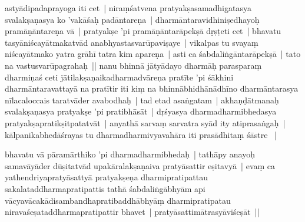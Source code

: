 \documentclass[article,12pt,a4paper]{memoir}%
\newcounter{parCount}
\begin{document}
astyādipadaprayoga iti cet | \label{thakur75-62.8} niraṃśatvena pratyakṣasamadhigatasya svalakṣaṇasya ko 'vakāśaḥ padāntareṇa | dharmāntaravidhiniṣedhayoḥ pramāṇāntareṇa vā | pratyakṣe 'pi pramāṇāntarāpekṣā dṛṣṭeti cet | bhavatu tasyāniścayātmakatvād anabhyastasvarūpaviṣaye | vikalpas tu svayaṃ niścayātmako yatra grāhī tatra kim apareṇa | asti ca śabdaliṅgāntarāpekṣā | tato na vastusvarūpagrahaḥ || \label{thakur75-62.13} nanu bhinnā jātyādayo dharmāḥ parasparaṃ dharmiṇaś ceti jātilakṣaṇaikadharmadvāreṇa pratīte 'pi śākhini dharmāntaravattayā na pratītir iti kiṃ na bhinnābhidhānādhīno dharmāntarasya nīlacaloccais taratvāder avabodhaḥ | tad etad asaṅgatam | akhaṇḍātmanaḥ svalakṣaṇasya pratyakṣe 'pi pratibhāsāt | dṛśyasya dharmadharmibhedasya pratyakṣapratikṣitpatatvāt | anyathā sarvaṃ sarvatra syād ity atiprasaṅgaḥ | kālpanikabhedāśrayas tu dharmadharmivyavahāra iti prasādhitaṃ śāstre  |
	{}
	\pend%
      

	  
	  \pstart \leavevmode%
	\label{thakur75-62.19}bhavatu vā pāramārthiko 'pi dharmadharmibhedaḥ | tathāpy anayoḥ samavāyāder dūṣitatvād upakāralakṣaṇaiva pratyāsattir eṣitavyā | evaṃ ca yathendriyapratyāsattyā pratyakṣeṇa dharmipratipattau sakalataddharmapratipattis tathā śabdaliṅgābhyām api vācyavācakādisambandhapratibaddhābhyāṃ dharmipratipatau niravaśeṣataddharmapratipattir bhavet | pratyāsattimātrasyāviśeṣāt ||
	{}
	\pend%
      
\end{document}
